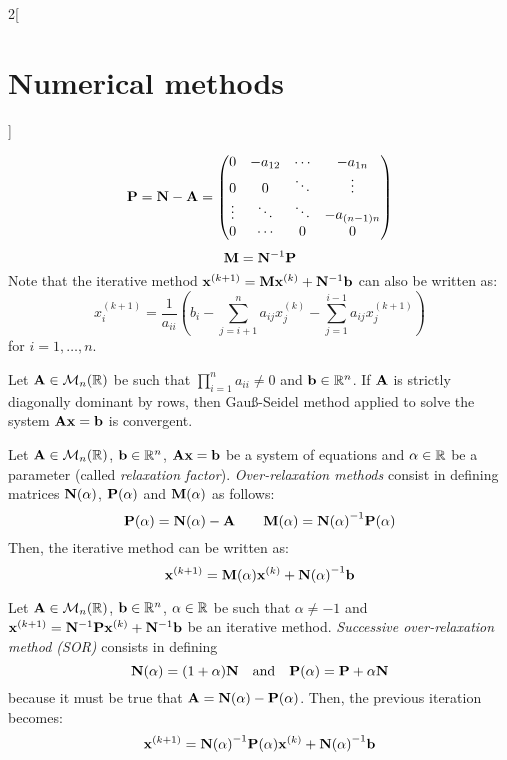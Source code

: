 \documentclass[../../../main.tex]{subfiles}
\begin{document}
\begin{multicols}{2}[\section{Numerical methods}]
\begin{definition}
\begin{equation*}
        \vb{P}=\vb{N}-\vb{A}=
        \begin{pmatrix}
            0 & -a_{12} & \cdots & -a_{1n}\\
            0 & 0 & \ddots & \vdots\\
            \vdots & \ddots & \ddots & -a_{(n-1)n}\\
            0 & \cdots & 0 & 0
        \end{pmatrix}
    \end{equation*}
    \begin{equation*}
        \vb{M}=\vb{N}^{-1}\vb{P}
    \end{equation*}
    Note that the iterative method $\vb{x}^{(k+1)}=\vb{M}\vb{x}^{(k)}+\vb{N}^{-1}\vb{b}$ can also be written as: $$x_i^{(k+1)}=\frac{1}{a_{ii}}\left(b_i-\sum_{j=i+1}^na_{ij}x_j^{(k)}-\sum_{j=1}^{i-1}a_{ij}x_j^{(k+1)}\right)$$ for $i=1,\ldots,n$.
\end{definition}
\begin{theorem}
    Let $\vb{A}\in\mathcal{M}_n(\mathbb{R})$ be such that $\prod_{i=1}^na_{ii}\ne 0$ and $\vb{b}\in\mathbb{R}^n$. If $\vb{A}$ is strictly diagonally dominant by rows, then Gau\ss-Seidel method applied to solve the system $\vb{A}\vb{x}=\vb{b}$ is convergent.
\end{theorem}
\begin{method}
    Let $\vb{A}\in\mathcal{M}_n(\mathbb{R})$, $\vb{b}\in\mathbb{R}^n$, $\vb{A}\vb{x}=\vb{b}$ be a system of equations and $\alpha\in\mathbb{R}$ be a parameter (called \textit{relaxation factor}). \textit{Over-relaxation methods} consist in defining matrices $\vb{N}(\alpha)$, $\vb{P}(\alpha)$ and $\vb{M}(\alpha)$ as follows:
    $$\vb{P}(\alpha)=\vb{N}(\alpha)-\vb{A}\qquad\vb{M}(\alpha)={\vb{N}(\alpha)}^{-1}\vb{P}(\alpha)$$
    Then, the iterative method can be written as: $$\vb{x}^{(k+1)}=\vb{M}(\alpha)\vb{x}^{(k)}+{\vb{N}(\alpha)}^{-1}\vb{b}$$
\end{method}
\begin{method}
    Let $\vb{A}\in\mathcal{M}_n(\mathbb{R})$, $\vb{b}\in\mathbb{R}^n$, $\alpha\in\mathbb{R}$ be such that $\alpha\ne-1$ and $\vb{x}^{(k+1)}=\vb{N}^{-1}\vb{P}\vb{x}^{(k)}+\vb{N}^{-1}\vb{b}$ be an iterative method. \textit{Successive over-relaxation method (SOR)} consists in defining $$\vb{N}(\alpha)=(1+\alpha)\vb{N}\quad\text{and}\quad\vb{P}(\alpha)=\vb{P}+\alpha\vb{N}$$ because it must be true that $\vb{A}=\vb{N}(\alpha)-\vb{P}(\alpha)$. Then, the previous iteration becomes: $$\vb{x}^{(k+1)}={\vb{N}(\alpha)}^{-1}\vb{P}(\alpha)\vb{x}^{(k)}+{\vb{N}(\alpha)}^{-1}\vb{b}$$

\end{method}
\end{multicols}
\end{document}
